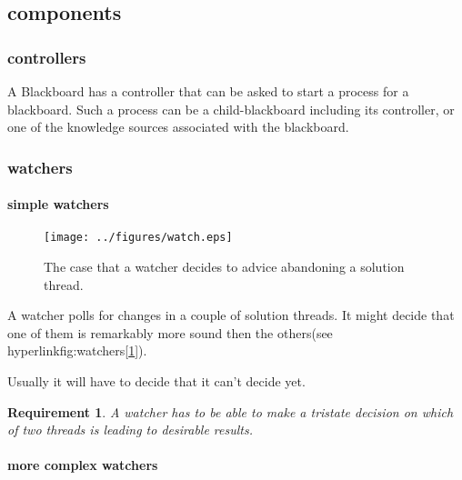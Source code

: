 \documentclass[]{lofar}
\newtheorem{requirement}{Requirement}[subsection]
\begin{document}
    \subsection{components}
    \label{subsec:components}\hypertarget{subsec:components}{}

      \subsubsection{controllers}
      \label{subsubsec:controllers}\hypertarget{subsubsec:controllers}{}

        A Blackboard has a controller that can be asked to start a
        process for a blackboard. Such a process can be a
        child-blackboard including its controller, or one of the
        knowledge sources associated with the blackboard.

      \subsubsection{watchers}
      \label{subsubsec:watchers}\hypertarget{subsubsec:watchers}{}

        \paragraph{simple watchers}
        \label{par:simple-watchers}\hypertarget{par:simple-watchers}{}
          \begin{figure}
            \texttt{[image: ../figures/watch.eps]}
            \hypertarget{fig:watchers}{}
            \caption{The case that a watcher decides to advice
            abandoning a solution thread.\label{fig:watchers}}
          \end{figure}

          A watcher polls for changes in a couple of solution
          threads. It might decide that one of them is remarkably more
          sound then the others(see
          hyperlink{fig:watchers}{[\ref{fig:watchers}]}).

          Usually it will have to decide that it can't decide yet.

          \begin{requirement}
            A watcher has to be able to make a tristate decision on
            which of two threads is leading to desirable results.
            \label{req:no-decision}
          \end{requirement}

        \paragraph{more complex watchers}
        \label{par:complex-watchers}\hypertarget{par:complex-watchers}{}
\end{document}
